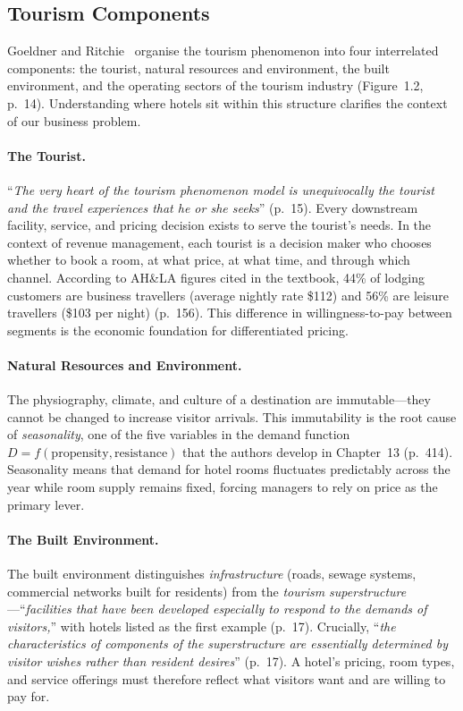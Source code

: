 \subsection{Tourism Components}

Goeldner and Ritchie~\cite{goeldner2009} organise the tourism phenomenon into four interrelated components: the tourist, natural resources and environment, the built environment, and the operating sectors of the tourism industry (Figure~1.2, p.~14). Understanding where hotels sit within this structure clarifies the context of our business problem.

\paragraph{The Tourist.}
``\emph{The very heart of the tourism phenomenon model is unequivocally the tourist and the travel experiences that he or she seeks}'' (p.~15). Every downstream facility, service, and pricing decision exists to serve the tourist's needs. In the context of revenue management, each tourist is a decision maker who chooses whether to book a room, at what price, at what time, and through which channel. According to AH\&LA figures cited in the textbook, 44\% of lodging customers are business travellers (average nightly rate \$112) and 56\% are leisure travellers (\$103 per night) (p.~156). This difference in willingness-to-pay between segments is the economic foundation for differentiated pricing.

\paragraph{Natural Resources and Environment.}
The physiography, climate, and culture of a destination are immutable---they cannot be changed to increase visitor arrivals. This immutability is the root cause of \emph{seasonality}, one of the five variables in the demand function $D = f(\text{propensity}, \text{resistance})$ that the authors develop in Chapter~13 (p.~414). Seasonality means that demand for hotel rooms fluctuates predictably across the year while room supply remains fixed, forcing managers to rely on price as the primary lever.

\paragraph{The Built Environment.}
The built environment distinguishes \emph{infrastructure} (roads, sewage systems, commercial networks built for residents) from the \emph{tourism superstructure}---``\emph{facilities that have been developed especially to respond to the demands of visitors,}'' with hotels listed as the first example (p.~17). Crucially, ``\emph{the characteristics of components of the superstructure are essentially determined by visitor wishes rather than resident desires}'' (p.~17). A hotel's pricing, room types, and service offerings must therefore reflect what visitors want and are willing to pay for.

